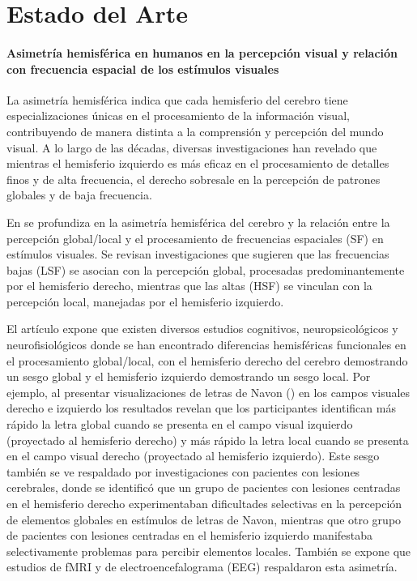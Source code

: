 \chapter{Estado del Arte}\label{chapter:state-of-the-art}

\subsubsection{Asimetr\'ia hemisf\'erica en humanos en la percepci\'on visual y relaci\'on con frecuencia espacial de los est\'imulos visuales}

La asimetría hemisf\'erica indica que cada hemisferio del cerebro tiene especializaciones únicas en el procesamiento de la información visual, contribuyendo de manera distinta a la comprensión y percepción del mundo visual. A lo largo de las décadas, diversas investigaciones han revelado que mientras el hemisferio izquierdo es más eficaz en el procesamiento de detalles finos y de alta frecuencia, el derecho sobresale en la percepción de patrones globales y de baja frecuencia.

En \cite{flevaris_spatial_2016} se profundiza en la asimetría hemisférica del cerebro y la relación entre la percepción global/local y el procesamiento de frecuencias espaciales (SF) en estímulos visuales. Se revisan investigaciones que sugieren que las frecuencias bajas (LSF) se asocian con la percepción global, procesadas predominantemente por el hemisferio derecho, mientras que las altas (HSF) se vinculan con la percepción local, manejadas por el hemisferio izquierdo. 

El art\'iculo expone que existen diversos estudios cognitivos, neuropsicológicos y neurofisiológicos donde se han encontrado diferencias hemisféricas funcionales en el procesamiento global/local, con el hemisferio derecho del cerebro demostrando un sesgo global y el hemisferio izquierdo demostrando un sesgo local. Por ejemplo, al presentar visualizaciones de letras de Navon (\cite{navon_forest_1977}) en los campos visuales derecho e izquierdo los resultados revelan que los participantes identifican más rápido la letra global cuando se presenta en el campo visual izquierdo (proyectado al hemisferio derecho) y más rápido la letra local cuando se presenta en el campo visual derecho (proyectado al hemisferio izquierdo). Este sesgo también se ve respaldado por investigaciones con pacientes con lesiones cerebrales, donde se identificó que un grupo de pacientes con lesiones centradas en el hemisferio derecho experimentaban dificultades selectivas en la percepción de elementos globales en estímulos de letras de Navon, mientras que otro grupo de pacientes con lesiones centradas en el hemisferio izquierdo manifestaba selectivamente problemas para percibir elementos locales. Tambi\'en se expone que estudios de fMRI  y de electroencefalograma (EEG) respaldaron esta asimetría.


